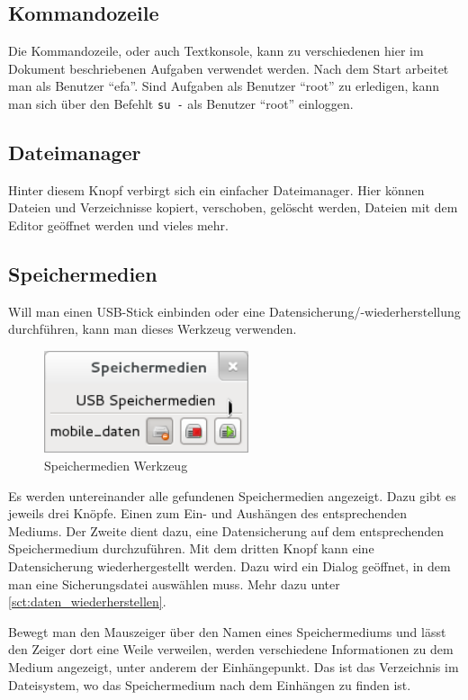 \documentclass[a4paper,12pt,twoside]{article}
\begin{document}
\subsection{Kommandozeile}
\label{sct:kommandozeile}
Die Kommandozeile, oder auch Textkonsole, kann zu verschiedenen hier im
Dokument beschriebenen Aufgaben verwendet werden. Nach dem Start
arbeitet man als Benutzer "`efa"'. Sind
Aufgaben als Benutzer "`root"' zu erledigen,
kann man sich über den Befehlt \texttt{su -} als
Benutzer "`root"' einloggen.


\subsection{Dateimanager}
\label{sct:dateimanager}
Hinter diesem Knopf verbirgt sich ein einfacher Dateimanager. Hier
können Dateien und Verzeichnisse kopiert, verschoben, gelöscht werden,
Dateien mit dem Editor geöffnet werden und vieles mehr.


\subsection{Speichermedien}
\label{sct:dialog_speichermedien}
Will man einen USB-Stick einbinden
oder eine Datensicherung/-wiederherstellung durchführen, kann man
dieses Werkzeug verwenden.

\begin{figure}
    \centering
    \includegraphics[width=6cm]{efaLivede-img/efaLivede-img20.png}
    \caption{Speichermedien Werkzeug}
    \label{fig:dialog_speichermedien}
\end{figure}

Es werden untereinander alle gefundenen Speichermedien angezeigt. Dazu
gibt es jeweils drei Knöpfe. Einen zum Ein- und Aushängen des
entsprechenden Mediums. Der Zweite dient dazu, eine Datensicherung auf
dem entsprechenden Speichermedium durchzuführen. Mit dem dritten Knopf
kann eine Datensicherung wiederhergestellt werden. Dazu wird ein Dialog
geöffnet, in dem man eine Sicherungsdatei auswählen muss. Mehr dazu unter
\ref{sct:daten_wiederherstellen}.

Bewegt man den Mauszeiger über den Namen eines Speichermediums und lässt
den Zeiger dort eine Weile verweilen, werden verschiedene Informationen
zu dem Medium angezeigt, unter anderem der Einhängepunkt. Das ist das
Verzeichnis im Dateisystem, wo das Speichermedium nach dem Einhängen zu
finden ist.
\end{document}
